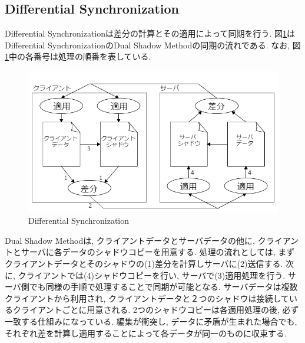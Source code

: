 \subsection{Differential Synchronization}
Differential Synchronizationは差分の計算とその適用によって同期を行う. 図\ref{DSfig}はDifferential SynchronizationのDual Shadow Methodの同期の流れである. なお, 図\ref{DSfig}中の各番号は処理の順番を表している.
\begin{figure}[htbp]
  \begin{center}
    \includegraphics[scale=0.7]{images/DS}
    \caption{Differential Synchronization}
    \label{DSfig}
  \end{center}
\end{figure}
Dual Shadow Methodは, クライアントデータとサーバデータの他に, クライアントとサーバに各データのシャドウコピーを用意する. 処理の流れとしては, まずクライアントデータとそのシャドウの(1)差分を計算しサーバに(2)送信する. 次に, クライアントでは(4)シャドウコピーを行い, サーバで(3)適用処理を行う. サーバ側でも同様の手順で処理することで同期が可能となる. サーバデータは複数クライアントから利用され, クライアントデータと２つのシャドウは接続しているクライアントごとに用意される. 2つのシャドウコピーは各適用処理の後, 必ず一致する仕組みになっている. 編集が衝突し, データに矛盾が生まれた場合でも, それぞれ差を計算し適用することによって各データが同一のものに収束する.
%
